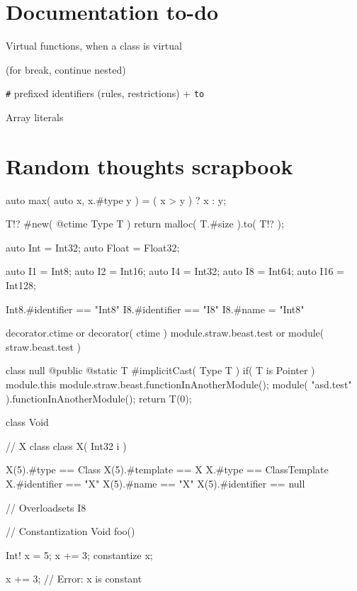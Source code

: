 \section{Documentation to-do}
\begin{compactitem}
	\item Virtual functions, when a class is virtual
	\item {}
	\item {} (for break, continue nested)
	\item {}
	\item \verb|#| prefixed identifiers (rules, restrictions) + \verb|to|
	\item {}
	\item Array literals
\end{compactitem}

\section{Random thoughts scrapbook}
\begin{code}
auto max( auto x, x.#type y ) = ( x > y ) ? x : y;

T!? #new( @ctime Type T ) {
	return malloc( T.#size ).to( T!? );
}

auto Int = Int32;
auto Float = Float32;

auto I1 = Int8;
auto I2 = Int16;
auto I4 = Int32;
auto I8 = Int64;
auto I16 = Int128;

Int8.#identifier == "Int8"
I8.#identifier == "I8"
I8.#name = "Int8"

decorator.ctime or decorator( ctime )
module.straw.beast.test or module( straw.beast.test )

class null {
	@public @static	T #implicitCast( Type T )
		if( T is Pointer )
	{
		module.this
		module.straw.beast.functionInAnotherModule();
		module( "asd.test" ).functionInAnotherModule();
		return T(0);
	}
}

class Void {}


// X class
class X( Int32 i ) {
}

X(5).#type == Class
X(5).#template == X
X.#type == ClassTemplate
X.#identifier == "X"
X(5).#name == "X"
X(5).#identifier == null

// Overloadsets
I8

// Constantization
Void foo() {
	Int! x = 5;
	x += 3;
	constantize x;
	
	x += 3; // Error: x is constant
}
\end{code}

